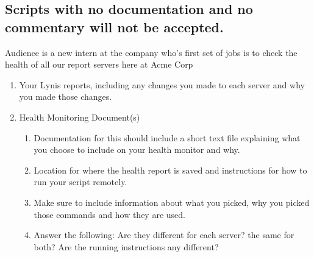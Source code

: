 \documentclass[12pt]{article}
\begin{document}
\subsection*{Scripts with no documentation and no commentary will not be accepted.}
Audience is a new intern at the company who's first set of jobs is to check the health of all our report servers here at Acme Corp
    \begin{enumerate}
        \item Your Lynis reports, including any changes you made to each server and why you made those changes. 
        \item Health Monitoring Document(s)
            \begin{enumerate}
                \item Documentation for this should include a short text file explaining what you choose to include on your health monitor and why.
                \item Location for where the health report is saved and instructions for how to run your script remotely.
                \item Make sure to include information about what you picked, why you picked those commands and how they are used.
                \item Answer the following: Are they different for each server? the same for both?  Are the running instructions any different?
            \end{enumerate}
    \end{enumerate}
\end{document}
